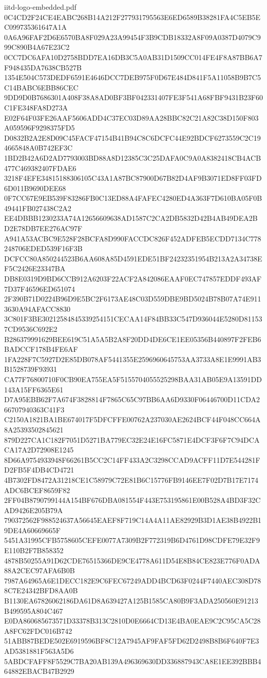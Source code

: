 \begin{filecontents*}[overwrite]{iitd-logo-embedded.pdf}
0C4CD2F24CE4EABC268B14A212F277931795563E6ED6589B38281FA4C5EB5EC099735361647A1A
0A6A96FAF2D6E6570BA8F029A23A99454F3B9CDB18332A8F09A0387D4079C999C890B4A67E23C2
0CC7DC6AFA10D2758BDD7EA16DB3C5A0AB31D1509CC014FE4F8A87BB6A7F948435DA7638CB527B
1354E504C573DEDF6591E4646DCC7DEB975F0D67E484D841F5A11058B9B7C5C14BABC6EBB86CEC
9DD9D0B7686301A408F38A8AD0BF3BF042331407FE3F541A68FBF9431B23F60C1FE348FA8D273A
E02F64F03FE26AAF5606ADD4C37EC03D89AA28BBC82C21A82C38D150F803A059596F9298375FD5
D0832B2A2E8D09C45FACF47154B41B94C8C6DCFC44E92BDCF6273559C2C194665848A0B742EF3C
1BD2B42A6D2AD7793003BD88A8D12385C3C25DAFA0C9A0A8382418CB4ACB477C469382407FDAE6
3218F4EFE34815188306105C43A1A87BC87900D67B82D4AF9B3071ED8FF03FD6D011B9690DEE68
0F7CC67E9EB539F83286FB0C13ED88A4FAFEC4280ED4A363F7D610BA05F0B49441FB027438C2A2
EE4DBBB1230233A74A12656609638AD1587C2CA2DB5832D42B4AB49DEA2BD2E78DB7EE276AC97F
A941A53ACBC9E528F28BCFA8D990FACCDC826F452ADFEB5ECDD7134C778248706EDED539F16F3B
DCFCC80A850244523B6AA608A85D4591EDE51BF24232351954B213A2A34738EF5C2426E23347BA
DB8E0319D9BD6CCB912A6203F22ACF2A842086EAAF0EC747857EDDF493AF7D37F46596ED651074
2F390B71D0224B96D9E5BC2F6173AE48C03D559DBE9BD5024B78B07A74E9113630A94AFACC8830
3C801F3BE30212584845339254151CECAA14F84BB33C547D936044E5280D811537CD9536C692E2
B286379991629BEE619C51A5A5B2A8F20DD4DE6CE1EE05356B440897F2FEB6BADCCF178B4FE6AF
1FA228F7C5927D2E85DB078AF5441355E2596960645753AA3733A8E1E9991AB3B1528739F93931
CA77F76800710F0CB90EA755EA5F5155704055525298BAA31AB05E9A13591DD143A15FF6365E61
D7A95EBB62F7A674F3828814F7865C65C97BB6AA6D9330F06446700D11CDA266707940363C41F3
C2150A1821BA1BE674017F5DFCFFE00762A237030AE2624BCF44F048CC664A8A25393502845621
879D227CA1C182F7051D5271BA779EC32E24E16FC5871E4DCF3F6F7C94DCACA17A2D72908E1245
8D66A9754933948F66261B5CC2C14FF433A2C3298CCAD9ACFF11D7E544281FD2FB5F4DB4CD4721
4B7302FD8472A31218CE1C58979C72E81B6C15776FB9146EE7F02D7B17E7174ADC6BCEF8659F82
2FF04B8790799144A154BF676DBA081554F443E753195861E00B528A4BD3F32CAD9426E205B79A
790372562F988524637A56645EAEF8F719C14A4A11AE82929B3D1AE38B4922B19DE4A60669665F
5451A31995CFB5758605CEFE0077A7309B2F772319B6D4761D98CDFE79E32F9E110B2F7B858352
4878B50255A91D62CDE76515366DE9CE4778A611D54E8B84CE823E776F0ADA88A2CEC97AFA6B0B
7987A64965A6E1DECC182E9C6FEC67249ADD4BCD63F0244F7440AEC308D788C7E24342BFD8AA0B
B1130EA67826062186DA61D8A639427A125B1585CA80B9F3ADA250560E91213B499595A804C467
E0DA860685673571D33378B313C2810D0E6664CD13E4BA0EAE9C2C95CA5C28A8FC62FDC016B742
51ABB87BEDE502E6919596BF8C12A7945AF9FAF5FD62D2498B8B6F640F7E3AD5381881F563A5D6
5ABDCFAFF8F5529C7BA20AB139A496369630DD336887943CA8E1EE392BBB464882EBACB47B2929

\end{filecontents*}
